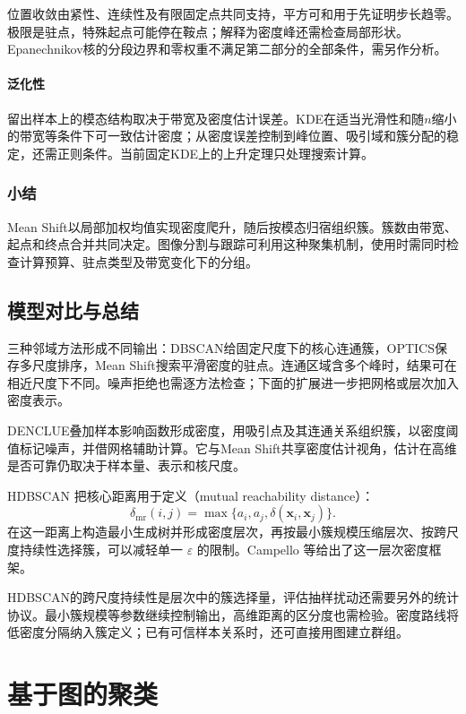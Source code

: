 位置收敛由紧性、连续性及有限固定点共同支持，平方可和用于先证明步长趋零。极限是驻点，特殊起点可能停在鞍点；解释为密度峰还需检查局部形状。Epanechnikov核的分段边界和零权重不满足第二部分的全部条件，需另作分析。

\paragraph{泛化性}
留出样本上的模态结构取决于带宽及密度估计误差。KDE在适当光滑性和随$n$缩小的带宽等条件下可一致估计密度；从密度误差控制到峰位置、吸引域和簇分配的稳定，还需正则条件。当前固定KDE上的上升定理只处理搜索计算。

\subsubsection{小结}

Mean Shift以局部加权均值实现密度爬升，随后按模态归宿组织簇。簇数由带宽、起点和终点合并共同决定。图像分割与跟踪可利用这种聚集机制，使用时需同时检查计算预算、驻点类型及带宽变化下的分组。

\subsection{模型对比与总结}

三种邻域方法形成不同输出：DBSCAN给固定尺度下的核心连通簇，OPTICS保存多尺度排序，Mean Shift搜索平滑密度的驻点。连通区域含多个峰时，结果可在相近尺度下不同。噪声拒绝也需逐方法检查；下面的扩展进一步把网格或层次加入密度表示。

DENCLUE叠加样本影响函数形成密度，用吸引点及其连通关系组织簇，以密度阈值标记噪声，并借网格辅助计算。它与Mean Shift共享密度估计视角，估计在高维是否可靠仍取决于样本量、表示和核尺度。

HDBSCAN 把核心距离用于定义（mutual reachability distance）：
\[
 \delta_{\mathrm{mr}}(i,j)
 =\max\{a_i,a_j,\delta(\bm{x}_i,\bm{x}_j)\}.
\]
在这一距离上构造最小生成树并形成密度层次，再按最小簇规模压缩层次、按跨尺度持续性选择簇，可以减轻单一 $\varepsilon$ 的限制。Campello 等给出了这一层次密度框架。

HDBSCAN的跨尺度持续性是层次中的簇选择量，评估抽样扰动还需要另外的统计协议。最小簇规模等参数继续控制输出，高维距离的区分度也需检验。密度路线将低密度分隔纳入簇定义；已有可信样本关系时，还可直接用图建立群组。

\section{基于图的聚类}
\label{sec:clustering-graph}

